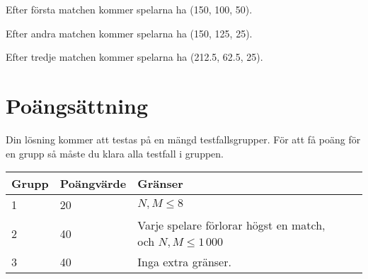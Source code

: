Efter första matchen kommer spelarna ha (150, 100, 50).

Efter andra matchen kommer spelarna ha (150, 125, 25).

Efter tredje matchen kommer spelarna ha (212.5, 62.5, 25).

\section*{Poängsättning}
Din lösning kommer att testas på en mängd testfallsgrupper. För att få poäng för en grupp
så måste du klara alla testfall i gruppen.

\begin{tabular}{| l | l | l | l |}
\hline
Grupp & Poängvärde & Gränser    \\ \hline
1     & 20         & $N, M \le 8$ \\ \hline
2     & 40         & Varje spelare förlorar högst en match, och $N, M \le 1\,000$  \\ \hline
3     & 40         & Inga extra gränser. \\ \hline
\end{tabular}
